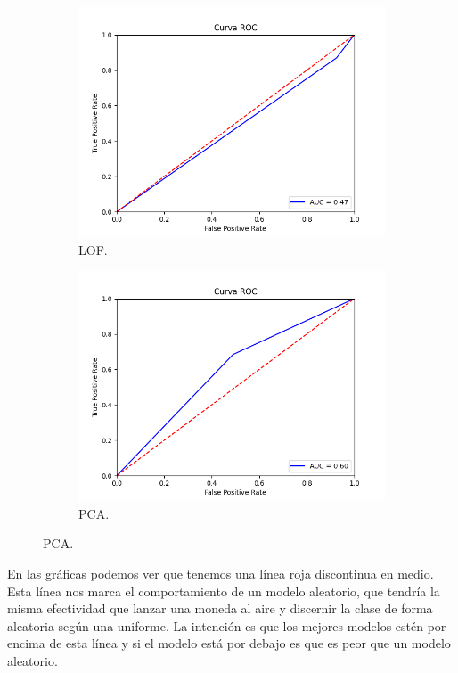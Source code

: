 \begin{figure}[H]
	\centering
	\begin{subfigure}{.49\textwidth}
		\centering
		\includegraphics[scale=0.42]{imagenes/roc/LOF_roc.png}
		\caption{LOF.}
	\end{subfigure}
	\begin{subfigure}{.49\textwidth}
		\centering
		\includegraphics[scale=0.42]{imagenes/roc/PCA_roc.png}
		\caption{PCA.}
	\end{subfigure}
	\label{img:roc6}
\end{figure}

En las gráficas podemos ver que tenemos una línea roja discontinua en medio. Esta línea nos marca el comportamiento de un modelo aleatorio, que tendría la misma efectividad que lanzar una moneda al aire y discernir la clase de forma aleatoria según una uniforme. La intención es que los mejores modelos estén por encima de esta línea y si el modelo está por debajo es que es peor que un modelo aleatorio.

